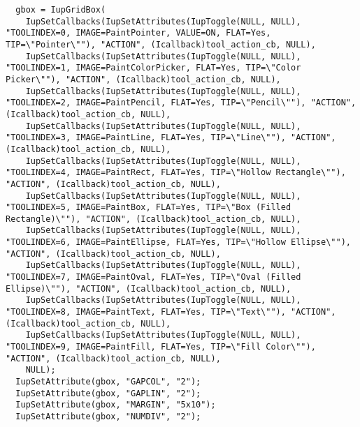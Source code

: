 \documentclass{ctexart}
\begin{document}
\begin{lstlisting}
  gbox = IupGridBox(
    IupSetCallbacks(IupSetAttributes(IupToggle(NULL, NULL), "TOOLINDEX=0, IMAGE=PaintPointer, VALUE=ON, FLAT=Yes, TIP=\"Pointer\""), "ACTION", (Icallback)tool_action_cb, NULL),
    IupSetCallbacks(IupSetAttributes(IupToggle(NULL, NULL), "TOOLINDEX=1, IMAGE=PaintColorPicker, FLAT=Yes, TIP=\"Color Picker\""), "ACTION", (Icallback)tool_action_cb, NULL),
    IupSetCallbacks(IupSetAttributes(IupToggle(NULL, NULL), "TOOLINDEX=2, IMAGE=PaintPencil, FLAT=Yes, TIP=\"Pencil\""), "ACTION", (Icallback)tool_action_cb, NULL),
    IupSetCallbacks(IupSetAttributes(IupToggle(NULL, NULL), "TOOLINDEX=3, IMAGE=PaintLine, FLAT=Yes, TIP=\"Line\""), "ACTION", (Icallback)tool_action_cb, NULL),
    IupSetCallbacks(IupSetAttributes(IupToggle(NULL, NULL), "TOOLINDEX=4, IMAGE=PaintRect, FLAT=Yes, TIP=\"Hollow Rectangle\""), "ACTION", (Icallback)tool_action_cb, NULL),
    IupSetCallbacks(IupSetAttributes(IupToggle(NULL, NULL), "TOOLINDEX=5, IMAGE=PaintBox, FLAT=Yes, TIP=\"Box (Filled Rectangle)\""), "ACTION", (Icallback)tool_action_cb, NULL),
    IupSetCallbacks(IupSetAttributes(IupToggle(NULL, NULL), "TOOLINDEX=6, IMAGE=PaintEllipse, FLAT=Yes, TIP=\"Hollow Ellipse\""), "ACTION", (Icallback)tool_action_cb, NULL),
    IupSetCallbacks(IupSetAttributes(IupToggle(NULL, NULL), "TOOLINDEX=7, IMAGE=PaintOval, FLAT=Yes, TIP=\"Oval (Filled Ellipse)\""), "ACTION", (Icallback)tool_action_cb, NULL),
    IupSetCallbacks(IupSetAttributes(IupToggle(NULL, NULL), "TOOLINDEX=8, IMAGE=PaintText, FLAT=Yes, TIP=\"Text\""), "ACTION", (Icallback)tool_action_cb, NULL),
    IupSetCallbacks(IupSetAttributes(IupToggle(NULL, NULL), "TOOLINDEX=9, IMAGE=PaintFill, FLAT=Yes, TIP=\"Fill Color\""), "ACTION", (Icallback)tool_action_cb, NULL),
    NULL);
  IupSetAttribute(gbox, "GAPCOL", "2");
  IupSetAttribute(gbox, "GAPLIN", "2");
  IupSetAttribute(gbox, "MARGIN", "5x10");
  IupSetAttribute(gbox, "NUMDIV", "2");


\end{lstlisting}
\end{document}
